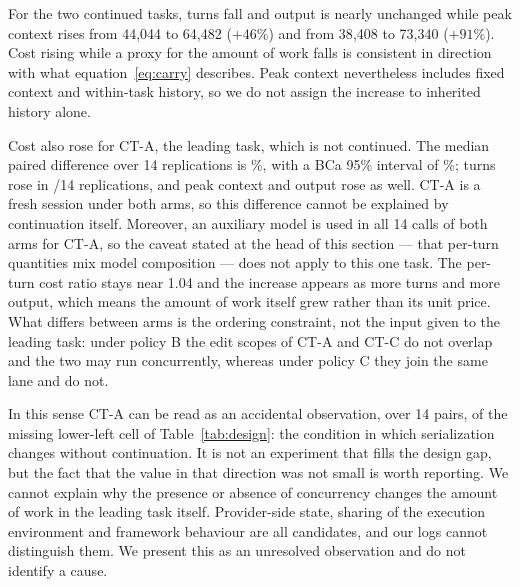 \documentclass[a4paper,11pt]{article}
\begin{document}
\begin{table}[!htbp]
\centering\small
\caption{CT by task. Turn deltas and relative cost differences are medians of the paired differences over 14 replications; peak context is the median within each arm. The per-turn cost ratio includes the difference in model composition and is not a unit price for processing history.}
\label{tab:mechanism}
\end{table}

For the two continued tasks, turns fall and output is nearly unchanged while peak context rises from 44{,}044 to 64{,}482 ($+46$\%) and from 38{,}408 to 73{,}340 ($+91$\%). Cost rising while a proxy for the amount of work falls is consistent in direction with what equation~\eqref{eq:carry} describes. Peak context nevertheless includes fixed context and within-task history, so we do not assign the increase to inherited history alone.

Cost also rose for CT-A, the leading task, which is not continued. The median paired difference over 14 replications is \CTAMedian\%, with a BCa 95\% interval of \CTACI\%; turns rose in \CTATurnUp/14 replications, and peak context and output rose as well. CT-A is a fresh session under both arms, so this difference cannot be explained by continuation itself. Moreover, an auxiliary model is used in all 14 calls of both arms for CT-A, so the caveat stated at the head of this section --- that per-turn quantities mix model composition --- does not apply to this one task. The per-turn cost ratio stays near 1.04 and the increase appears as more turns and more output, which means the amount of work itself grew rather than its unit price. What differs between arms is the ordering constraint, not the input given to the leading task: under policy B the edit scopes of CT-A and CT-C do not overlap and the two may run concurrently, whereas under policy C they join the same lane and do not.

In this sense CT-A can be read as an accidental observation, over 14 pairs, of the missing lower-left cell of Table~\ref{tab:design}: the condition in which serialization changes without continuation. It is not an experiment that fills the design gap, but the fact that the value in that direction was not small is worth reporting. We cannot explain why the presence or absence of concurrency changes the amount of work in the leading task itself. Provider-side state, sharing of the execution environment and framework behaviour are all candidates, and our logs cannot distinguish them. We present this as an unresolved observation and do not identify a cause.
\end{document}
